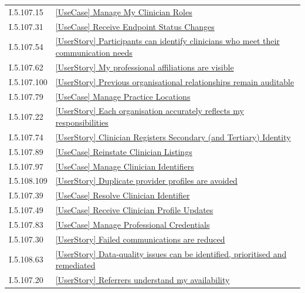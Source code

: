 \begin{longtable}{p{.22\linewidth}p{.73\linewidth}}
I.5.107.15 & \hyperref[element:4e2660120beb42c7a08cffe9afa81b92]{[UseCase] Manage My Clinician Roles} \\
I.5.107.31 & \hyperref[element:51201cfa24734a829da427c56e212f95]{[UseCase] Receive Endpoint Status Changes} \\
I.5.107.54 & \hyperref[element:53cdfb6966ef48d584632ae6085f9dd6]{[UserStory] Participants can identify clinicians who meet their communication needs} \\
I.5.107.62 & \hyperref[element:54a37e284fb549ea9f1a1332927fc6c5]{[UserStory] My professional affiliations are visible} \\
I.5.107.100 & \hyperref[element:557c655fb77146dbb33177170ce2af7a]{[UserStory] Previous organisational relationships remain auditable} \\
I.5.107.79 & \hyperref[element:57ea85c5b21e43af80d66a78e5e60680]{[UseCase] Manage Practice Locations} \\
I.5.107.22 & \hyperref[element:592ac377e23f4501a485390d1e9fd0ed]{[UserStory] Each organisation accurately reflects my responsibilities} \\
I.5.107.74 & \hyperref[element:5a3b5f9972ef4e81a656dd8645ca7c92]{[UserStory] Clinician Registers Secondary (and Tertiary) Identity} \\
I.5.107.89 & \hyperref[element:5dbf49f216f9457d9c129f74476efb49]{[UseCase] Reinstate Clinician Listings} \\
I.5.107.97 & \hyperref[element:5f1de7e070be4c6e8420d91325f12dd1]{[UseCase] Manage Clinician Identifiers} \\
I.5.108.109 & \hyperref[element:614b487c089749e3b976fc9e6731f78c]{[UserStory] Duplicate provider profiles are avoided} \\
I.5.107.39 & \hyperref[element:62333d89b23b4b349b4b42831522a950]{[UseCase] Resolve Clinician Identifier} \\
I.5.107.49 & \hyperref[element:6377a96c247a429bbca75561f6671961]{[UseCase] Receive Clinician Profile Updates} \\
I.5.107.83 & \hyperref[element:63846cbb18874902b1f2605dad482f3b]{[UseCase] Manage Professional Credentials} \\
I.5.107.30 & \hyperref[element:68bde1917fde4229ac7074b045f1aa4f]{[UserStory] Failed communications are reduced} \\
I.5.108.63 & \hyperref[element:6afb5df83ce140679f385ddff2960a51]{[UserStory] Data-quality issues can be identified, prioritised and remediated} \\
I.5.107.20 & \hyperref[element:6d1e524a61db48efb7db74034d6157d5]{[UserStory] Referrers understand my availability} \\

\end{longtable}
